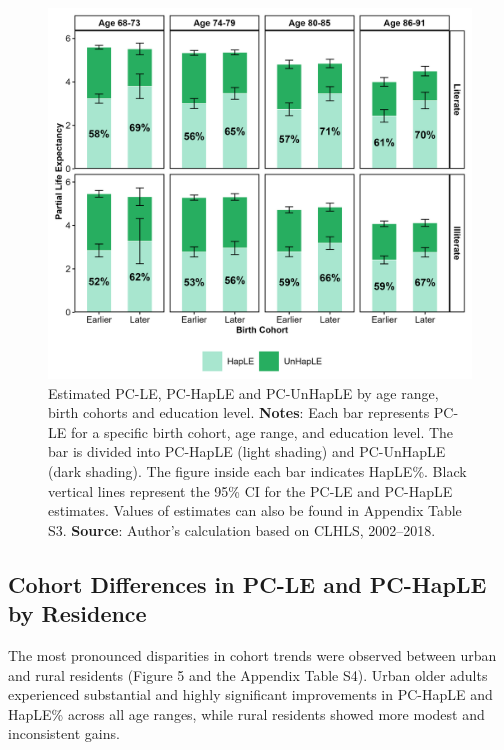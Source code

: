 \documentclass[12pt, a4paper]{article}
\begin{document}
\begin{figure}[!p]
  \centering
  \includegraphics[width=1\textwidth]{fig_tabs_b300/2_3_HapLE_stacked_plots_edu.png}
  \caption{Estimated PC-LE, PC-HapLE and PC-UnHapLE by age range, birth cohorts and education level. \textbf{Notes}: Each bar represents PC-LE for a specific birth cohort, age range, and education level. The bar is divided into PC-HapLE (light shading) and PC-UnHapLE (dark shading). The figure inside each bar indicates HapLE\%. Black vertical lines represent the 95\% CI for the PC-LE and PC-HapLE estimates. Values of estimates can also be found in Appendix Table S3. \textbf{Source}: Author's calculation based on CLHLS, 2002–2018.}
\end{figure}

\subsection{Cohort Differences in PC-LE and PC-HapLE by Residence}

The most pronounced disparities in cohort trends were observed between urban and rural residents (Figure 5 and the Appendix Table S4). Urban older adults experienced substantial and highly significant improvements in PC-HapLE and HapLE\% across all age ranges, while rural residents showed more modest and inconsistent gains.
\end{document}
